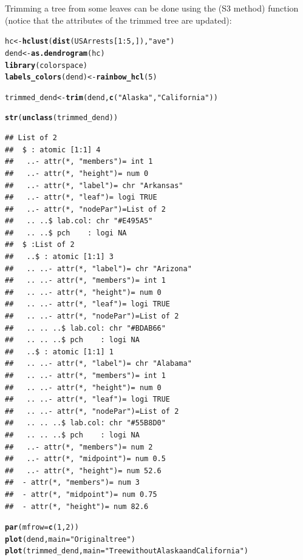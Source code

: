 \documentclass[shortnames,nojss,article]{jss}\usepackage[]{graphicx}\usepackage[]{color}
\makeatletter
\newcommand{\hlnum}[1]{\textcolor[rgb]{0.686,0.059,0.569}{#1}}%
\newcommand{\hlstr}[1]{\textcolor[rgb]{0.192,0.494,0.8}{#1}}%
\newcommand{\hlopt}[1]{\textcolor[rgb]{0,0,0}{#1}}%
\newcommand{\hlstd}[1]{\textcolor[rgb]{0.345,0.345,0.345}{#1}}%
\newcommand{\hlkwb}[1]{\textcolor[rgb]{0.69,0.353,0.396}{#1}}%
\newcommand{\hlkwc}[1]{\textcolor[rgb]{0.333,0.667,0.333}{#1}}%
\newcommand{\hlkwd}[1]{\textcolor[rgb]{0.737,0.353,0.396}{\textbf{#1}}}%
\newenvironment{kframe}{%
 \def\at@end@of@kframe{}%
 \ifinner\ifhmode%
  \def\at@end@of@kframe{\end{minipage}}%
  \begin{minipage}{\columnwidth}%
 \fi\fi%
 \def\FrameCommand##1{\hskip\@totalleftmargin \hskip-\fboxsep
 \colorbox{shadecolor}{##1}\hskip-\fboxsep
     \hskip-\linewidth \hskip-\@totalleftmargin \hskip\columnwidth}%
 \MakeFramed {\advance\hsize-\width
   \@totalleftmargin\z@ \linewidth\hsize
   \@setminipage}}%
 {\par\unskip\endMakeFramed%
 \at@end@of@kframe}
\newenvironment{knitrout}{}{} %
\makeatother
\begin{document}
Trimming a tree from some leaves can be done using the  (S3 method) function (notice that the attributes of the trimmed tree are updated):

\begin{knitrout}
\color{fgcolor}\begin{kframe}
\begin{alltt}
\hlstd{hc} \hlkwb{<-} \hlkwd{hclust}\hlstd{(}\hlkwd{dist}\hlstd{(USArrests[}\hlnum{1}\hlopt{:}\hlnum{5}\hlstd{, ]),} \hlstr{"ave"}\hlstd{)}
\hlstd{dend} \hlkwb{<-} \hlkwd{as.dendrogram}\hlstd{(hc)}
\hlkwd{library}\hlstd{(colorspace)}
\hlkwd{labels_colors}\hlstd{(dend)} \hlkwb{<-} \hlkwd{rainbow_hcl}\hlstd{(}\hlnum{5}\hlstd{)}

\hlstd{trimmed_dend} \hlkwb{<-} \hlkwd{trim}\hlstd{(dend,} \hlkwd{c}\hlstd{(}\hlstr{"Alaska"}\hlstd{,} \hlstr{"California"}\hlstd{)}\hlstd{)}

\hlkwd{str}\hlstd{(}\hlkwd{unclass}\hlstd{(trimmed_dend))}
\end{alltt}
\begin{verbatim}
## List of 2
##  $ : atomic [1:1] 4
##   ..- attr(*, "members")= int 1
##   ..- attr(*, "height")= num 0
##   ..- attr(*, "label")= chr "Arkansas"
##   ..- attr(*, "leaf")= logi TRUE
##   ..- attr(*, "nodePar")=List of 2
##   .. ..$ lab.col: chr "#E495A5"
##   .. ..$ pch    : logi NA
##  $ :List of 2
##   ..$ : atomic [1:1] 3
##   .. ..- attr(*, "label")= chr "Arizona"
##   .. ..- attr(*, "members")= int 1
##   .. ..- attr(*, "height")= num 0
##   .. ..- attr(*, "leaf")= logi TRUE
##   .. ..- attr(*, "nodePar")=List of 2
##   .. .. ..$ lab.col: chr "#BDAB66"
##   .. .. ..$ pch    : logi NA
##   ..$ : atomic [1:1] 1
##   .. ..- attr(*, "label")= chr "Alabama"
##   .. ..- attr(*, "members")= int 1
##   .. ..- attr(*, "height")= num 0
##   .. ..- attr(*, "leaf")= logi TRUE
##   .. ..- attr(*, "nodePar")=List of 2
##   .. .. ..$ lab.col: chr "#55B8D0"
##   .. .. ..$ pch    : logi NA
##   ..- attr(*, "members")= num 2
##   ..- attr(*, "midpoint")= num 0.5
##   ..- attr(*, "height")= num 52.6
##  - attr(*, "members")= num 3
##  - attr(*, "midpoint")= num 0.75
##  - attr(*, "height")= num 82.6
\end{verbatim}
\begin{alltt}
\hlkwd{par}\hlstd{(}\hlkwc{mfrow} \hlstd{=} \hlkwd{c}\hlstd{(}\hlnum{1}\hlstd{,} \hlnum{2}\hlstd{))}
\hlkwd{plot}\hlstd{(dend,} \hlkwc{main} \hlstd{=} \hlstr{"Original tree"}\hlstd{)}
\hlkwd{plot}\hlstd{(trimmed_dend,} \hlkwc{main} \hlstd{=} \hlstr{"Tree without Alaska and California"}\hlstd{)}
\end{alltt}
\end{kframe}


\end{knitrout}
\end{document}
